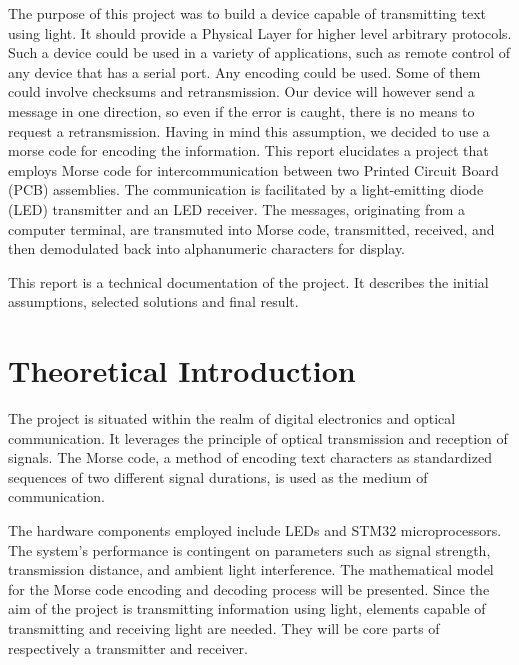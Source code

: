 \documentclass[12pt]{article}
\begin{document}
  The purpose of this project was to build a device capable of transmitting text using light. It should provide a Physical Layer for higher level arbitrary protocols.
  Such a device could be used in a variety of applications, such as remote control of any device that has a serial port.
  Any encoding could be used. Some of them could involve checksums and retransmission. Our device will however send a message in one direction, so even if the error is caught,
  there is no means to request a retransmission.
  Having in mind this assumption, we decided to use a morse code for encoding the information.
  This report elucidates a project that employs Morse code for intercommunication between two Printed Circuit Board (PCB) assemblies. The communication is facilitated by a light-emitting 
  diode (LED) transmitter and an LED receiver. The messages, originating from a computer terminal, are transmuted into Morse code, transmitted, received, and then demodulated back into alphanumeric characters for display.

  This report is a technical documentation of the project. It describes the initial assumptions, selected solutions and final result.
  \newpage

	
	\section{Theoretical Introduction}
 The project is situated within the realm of digital electronics and optical communication. It leverages the principle of optical transmission and reception of signals. The Morse code, a method of encoding text characters as standardized 
  sequences of two different signal durations, is used as the medium of communication. 

  The hardware components employed include LEDs and STM32 microprocessors. The system's performance is contingent on parameters such as signal strength, 
  transmission distance, and ambient light interference. The mathematical model for the Morse code encoding and decoding process will be presented.
  Since the aim of the project is transmitting information using light, elements capable of transmitting and receiving light are needed.
  They will be core parts of respectively a transmitter and receiver.
\end{document}
